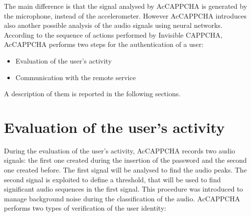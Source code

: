 The main difference is that the signal analysed by AcCAPPCHA is generated by the microphone, instead of the accelerometer. However AcCAPPCHA introduces also another possible analysis of the audio signals using neural networks.\\
According to the sequence of actions performed by Invisible CAPPCHA, AcCAPPCHA performs two steps for the authentication of a user:
\begin{itemize}
\item{Evaluation of the user's activity}
\item{Communication with the remote service}
\end{itemize}
A description of them is reported in the following sections.

\section{Evaluation of the user's activity}\label{AcCAPPCHA:user_activity}
During the evaluation of the user's activity, AcCAPPCHA records two audio signals: the first one created during the insertion of the password and the second one created before. The first signal will be analysed to find the audio peaks. The second signal is exploited to define a threshold, that will be used to find significant audio sequences in the first signal. This procedure was introduced to manage background noise during the classification of the audio. AcCAPPCHA performs two types of verification of the user identity:
